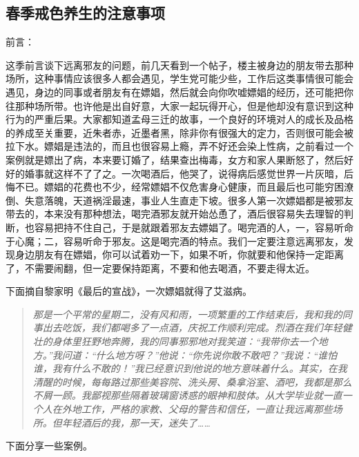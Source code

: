 \subsection{春季戒色养生的注意事项}

前言：

这季前言谈下远离邪友的问题，前几天看到一个帖子，楼主被身边的朋友带去那种场所，这种事情应该很多人都会遇见，学生党可能少些，工作后这类事情很可能会遇见，身边的同事或者朋友有在嫖娼，然后就会向你吹嘘嫖娼的经历，还可能把你往那种场所带。也许他是出自好意，大家一起玩得开心，但是他却没有意识到这种行为的严重后果。大家都知道孟母三迁的故事，一个良好的环境对人的成长及品格的养成至关重要，近朱者赤，近墨者黑，除非你有很强大的定力，否则很可能会被拉下水。嫖娼是违法的，而且也很容易上瘾，弄不好还会染上性病，之前看过一个案例就是嫖出了病，本来要订婚了，结果查出梅毒，女方和家人果断怒了，然后好好的婚事就这样不了了之。一次喝酒后，他哭了，说得病后感觉世界一片灰暗，后悔不已。嫖娼的花费也不少，经常嫖娼不仅危害身心健康，而且最后也可能穷困潦倒、失意落魄，天道祸淫最速，事业人生直走下坡。很多人第一次嫖娼都是被邪友带去的，本来没有那种想法，喝完酒邪友就开始怂恿了，酒后很容易失去理智的判断，也容易把持不住自己，于是就跟着邪友去嫖娼了。喝完酒的人，一，容易听命于心魔；二，容易听命于邪友。这是喝完酒的特点。我们一定要注意远离邪友，发现身边朋友有在嫖娼，你可以试着劝一下，如果不听，你就要和他保持一定距离了，不需要闹翻，但一定要保持距离，不要和他去喝酒，不要走得太近。

下面摘自黎家明《最后的宣战》，一次嫖娼就得了艾滋病。

\begin{quote}\it
    那是一个平常的星期二，没有风和雨，一项繁重的工作结束后，我和我的同事出去吃饭，我们都喝多了一点酒，庆祝工作顺利完成。烈酒在我们年轻健壮的身体里狂野地奔腾，我的同事邪邪地对我笑道：“我带你去一个地方。”我问道：“什么地方呀？”他说：“你先说你敢不敢吧？”我说：“谁怕谁，我有什么不敢的！”我已经意识到他说的地方意味着什么。其实，在我清醒的时候，每每路过那些美容院、洗头房、桑拿浴室、酒吧，我都是那么不屑一顾。我鄙视那些隔着玻璃窗诱惑的眼神和肢体。从大学毕业就一直一个人在外地工作，严格的家教、父母的警告和信任，一直让我远离那些场所。但年轻酒后的我，那一天，迷失了……
\end{quote}

下面分享一些案例。

